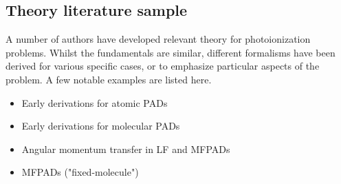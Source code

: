 \subsection{Theory literature sample\label{sec:theory-lit}}

A number of authors have developed relevant theory for photoionization problems. Whilst the fundamentals are similar, different formalisms have been derived for various specific cases, or to emphasize particular aspects of the problem. A few notable examples are listed here.

\begin{itemize}
\item Early derivations for atomic PADs \cite{Cherepkov1979,Cooper1968,Cooper1969,Klar1982}
\item Early derivations for molecular PADs \cite{Tully1968, Buckingham1970}
\item Angular momentum transfer in LF and MFPADs \cite{Fano1972} 
\item MFPADs ("fixed-molecule") \cite{Dill1976}
\end{itemize}
